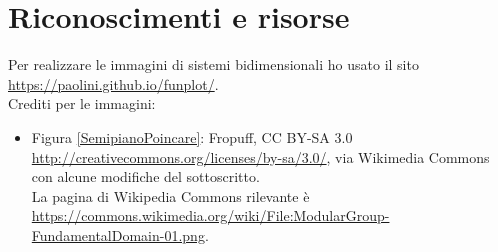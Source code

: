 \chapter{Riconoscimenti e risorse}
Per realizzare le immagini di sistemi bidimensionali ho usato il sito \url{https://paolini.github.io/funplot/}.\\
Crediti per le immagini:
\begin{itemize}
\item Figura \ref{SemipianoPoincare}: Fropuff, CC BY-SA 3.0 \url{http://creativecommons.org/licenses/by-sa/3.0/}, via Wikimedia Commons con alcune modifiche del sottoscritto.\\
La pagina di Wikipedia Commons rilevante \`e \url{https://commons.wikimedia.org/wiki/File:ModularGroup-FundamentalDomain-01.png}.
\end{itemize}
